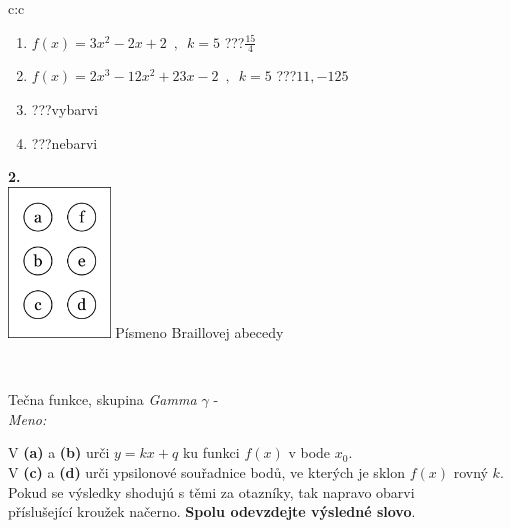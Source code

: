\documentclass[10pt]{report}
\begin{document}
\begin{tabular}{c:c}
\begin{minipage}[c][104.5mm][t]{0.5\linewidth}
\begin{center}
\begin{minipage}{0.79\linewidth}
\begin{center}
\begin{varwidth}{\linewidth}
\begin{enumerate}
\item $f(x)=3x^2-2x+2\enspace , \enspace k=5$\quad \dotfill\; ???\;\dotfill \quad $\frac{15}{4}$
\item $f(x)=2x^3-12x^2+23x-2\enspace , \enspace k=5$\quad \dotfill\; ???\;\dotfill \quad $11 , -125$
\item \quad \dotfill\; ???\;\dotfill \quad vybarvi
\item \quad \dotfill\; ???\;\dotfill \quad nebarvi
\end{enumerate}
\end{varwidth}
\end{center}
\end{minipage}
\begin{minipage}{0.20\linewidth}
\begin{center}
{\Huge\bfseries 2.} \\[2mm]
\includegraphics[height=40mm]{../images/braille.png}
{\small Písmeno Braillovej abecedy}
\end{center}
\end{minipage}
\end{center}
\end{minipage}
\\ \hdashline
\begin{minipage}[c][104.5mm][t]{0.5\linewidth}
\begin{center}
\vspace{7mm}
{\huge Tečna funkce, skupina \textit{Gamma $\gamma$} -}\\[5mm]
\textit{Meno:}\phantom{xxxxxxxxxxxxxxxxxxxxxxxxxxxxxxxxxxxxxxxxxxxxxxxxxxxxxxxxxxxxxxxxx}\\[5mm]
\begin{minipage}{0.95\linewidth}
\begin{center}
V \textbf{(a)} a \textbf{(b)} urči  $y = kx + q$ ku funkci $f(x)$ v bode $x_0$.\\V \textbf{(c)} a \textbf{(d)} urči ypsilonové souřadnice bodů, ve kterých je sklon $f(x)$ rovný $k$.\\Pokud se výsledky shodujú s těmi za otazníky, tak napravo obarvi\\příslušející kroužek načerno. \textbf{Spolu odevzdejte výsledné slovo}.

\end{center}
\end{minipage}
\end{center}
\end{minipage}
\end{tabular}
\end{document}
